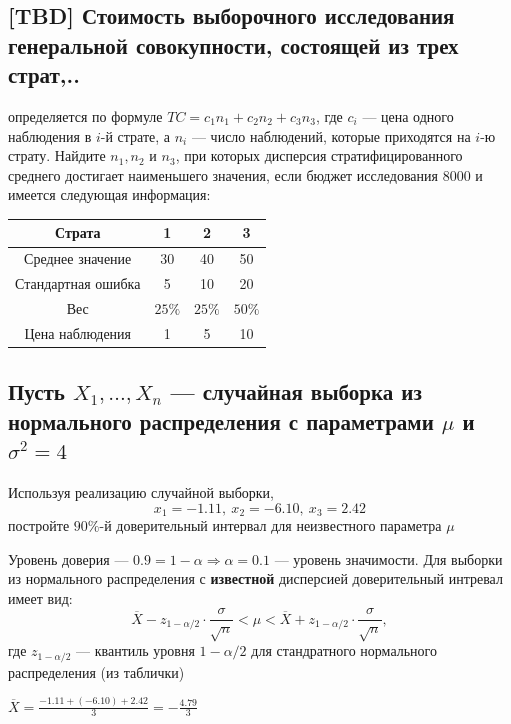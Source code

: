 \documentclass{article}
\begin{document}
\subsection{[TBD] Стоимость выборочного исследования генеральной совокупности, состоящей из трех страт,..}
определяется по формуле $T C=c_{1} n_{1}+c_{2} n_{2}+c_{3} n_{3}$, где $c_{i}$ — цена одного наблюдения в $i$-й страте, а $n_{i}$ — число наблюдений, которые приходятся на $i$-ю страту. Найдите $n_{1}, n_{2}$ и $n_{3}$, при которых дисперсия стратифицированного среднего достигает наименьшего значения, если бюджет исследования 8000 и имеется следующая информация:
\begin{center}
    \begin{tabular}{cccc}
        \hline Страта & 1 & 2 & 3 \\
        \hline Среднее значение & 30 & 40 & 50 \\
        Стандартная ошибка & 5 & 10 & 20 \\
        Вес & $25 \%$ & $25 \%$ & $50 \%$ \\
        Цена наблюдения & 1 & 5 & 10 \\
        \hline
    \end{tabular}    
\end{center}

\subsection{Пусть $X_{1}, \ldots, X_{n}$ — случайная выборка из нормального распределения с параметрами $\mu$ и $\sigma^{2}=4$}
Используя реализацию случайной выборки,
\begin{equation*}
    x_{1}=-1.11,\ x_{2}=-6.10,\ x_{3}=2.42
\end{equation*}
постройте $90 \%$-й доверительный интервал для неизвестного параметра $\mu$

Уровень доверия — $0.9=1-\alpha\Longrightarrow\alpha=0.1$ — уровень значимости. Для выборки из нормального распределения с \textbf{известной} дисперсией доверительный интревал имеет вид:
\begin{equation*}
    \overline{X}-z_{1-\alpha/2}\cdot\frac{\sigma}{\sqrt{n}}<\mu<\overline{X}+z_{1-\alpha/2}\cdot\frac{\sigma}{\sqrt{n}},
\end{equation*}
где $z_{1-\alpha/2}$ — квантиль уровня $1-\alpha/2$ для стандратного нормального распределения (из таблички)

\comment $\overline{X}=\displaystyle\frac{-1.11+(-6.10)+2.42}{3}=-\frac{4.79}{3}$
\end{document}
